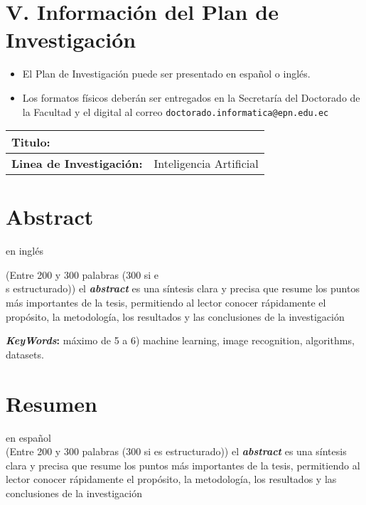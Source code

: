 \documentclass[a4paper,12pt]{article}
\begin{document}
\section*{V. Información del Plan de Investigación}

\begin{itemize}
	\item El Plan de Investigación puede ser presentado en español o inglés.
	\item Los formatos físicos deberán ser entregados en la Secretaría del Doctorado de la Facultad y el digital al correo \texttt{doctorado.informatica@epn.edu.ec}
\end{itemize}

\begin{longtable}{|p{}|p{}|}
	\hline
	\textbf{Titulo:}                 &                         \\ \hline
	\textbf{Linea de Investigación:} & Inteligencia Artificial \\ \hline
	
\end{longtable}

\thispagestyle{empty}  %
\newpage
\tableofcontents
\newpage
\section*{Abstract} en inglés

(Entre 200 y 300 palabras (300 si e\\
s estructurado))
el \textbf{\textit{abstract}} es una síntesis clara y precisa que resume los puntos más importantes de la tesis, permitiendo al lector conocer rápidamente el propósito, la metodología, los resultados y las conclusiones de la investigación

\textbf{\textit{KeyWords}:} máximo de 5 a 6)
machine learning, image recognition, algorithms, datasets.
\section*{Resumen} en español	\\
(Entre 200 y 300 palabras (300 si es estructurado))
el \textbf{\textit{abstract}} es una síntesis clara y precisa que resume los puntos más importantes de la tesis, permitiendo al lector conocer rápidamente el propósito, la metodología, los resultados y las conclusiones de la investigación
\end{document}
